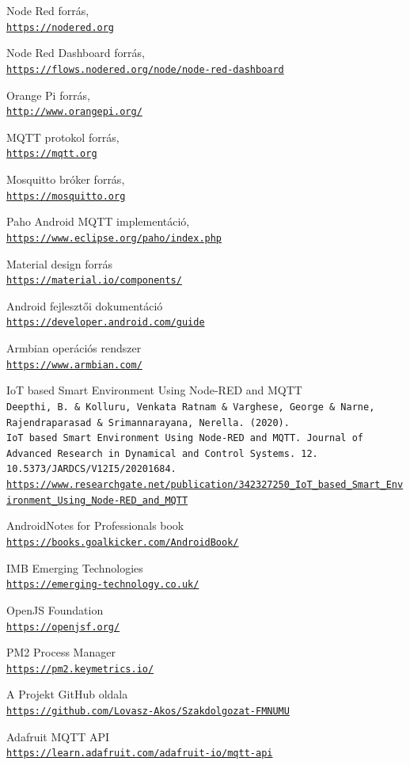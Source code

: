 \documentclass[
]{thesis-ekf}
\theoremstyle{definition}
\theoremstyle{remark}
\begin{document}
\begin{thebibliography}{2}
Node Red forrás,
\\\texttt{\url{https://nodered.org}}

Node Red Dashboard forrás,
\\\texttt{\url{https://flows.nodered.org/node/node-red-dashboard}}

Orange Pi forrás,
\\\texttt{\url{http://www.orangepi.org/}}

MQTT protokol forrás,
\\\texttt{\url{https://mqtt.org}}

Mosquitto bróker forrás,
\\\texttt{\url{https://mosquitto.org}}

Paho Android MQTT implementáció,
\\\texttt{\url{https://www.eclipse.org/paho/index.php}}

Material design forrás
\\\texttt{\url{https://material.io/components/}}

Android fejlesztői dokumentáció
\\\texttt{\url{https://developer.android.com/guide}}

Armbian operációs rendszer
\\\texttt{\url{https://www.armbian.com/}}

IoT based Smart Environment Using Node-RED and MQTT
\\\texttt{Deepthi, B. \& Kolluru, Venkata Ratnam \& Varghese, George \& Narne, Rajendraparasad \& Srimannarayana, Nerella. (2020).}
\\\texttt{IoT based Smart Environment Using Node-RED and MQTT. Journal of Advanced Research in Dynamical and Control Systems. 12. 10.5373/JARDCS/V12I5/20201684.}
\\\texttt{\url{https://www.researchgate.net/publication/342327250_IoT_based_Smart_Environment_Using_Node-RED_and_MQTT}}
	
Android\texttrademark Notes for Professionals book
\\\texttt{\url{https://books.goalkicker.com/AndroidBook/}}

IMB Emerging Technologies
\\\texttt{\url{https://emerging-technology.co.uk/}}

OpenJS Foundation
\\\texttt{\url{https://openjsf.org/}}

PM2 Process Manager
\\\texttt{\url{https://pm2.keymetrics.io/}}

A Projekt GitHub oldala
\\\texttt{\url{https://github.com/Lovasz-Akos/Szakdolgozat-FMNUMU}}

Adafruit MQTT API
\\\texttt{\url{https://learn.adafruit.com/adafruit-io/mqtt-api}}
\end{thebibliography}
%
\end{document}
